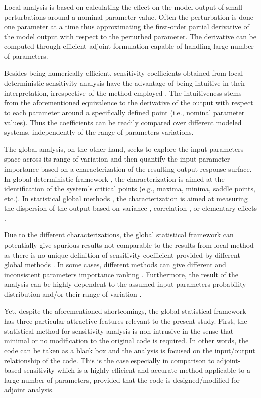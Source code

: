 Local analysis is based on calculating the effect on the model output of small perturbations around a nominal parameter value. 
Often the perturbation is done one parameter at a time thus approximating the first-order partial derivative of the model output with respect to the perturbed parameter. 
The derivative can be computed through efficient adjoint formulation \cite{Cacuci2003,Cacuci2010} capable of handling large number of parameters.

Besides being numerically efficient, 
sensitivity coefficients obtained from local deterministic sensitivity analysis have the advantage of being intuitive in their interpretation, 
irrespective of the method employed \cite{Razavi2015}. 
The intuitiveness stems from the aforementioned equivalence to the derivative of the output with respect to each parameter \cite{Ionescu-Bujor2004} around a specifically defined point (i.e., nominal parameter values). 
Thus the coefficients can be readily compared over different modeled systems, 
independently of the range of parameters variations.

The global analysis, on the other hand, 
seeks to explore the input parameters space across its range of variation 
and then quantify the input parameter importance based on a characterization of the resulting output response surface. 
In global deterministic framework \cite{Ionescu-Bujor2004,Cacuci2010}, 
the characterization is aimed at the identification of the system’s critical points (e.g., maxima, minima, saddle points, etc.). 
In statistical global methods \cite{Saltelli2008, Saltelli2004, Saltelli2006}, 
the characterization is aimed at measuring the dispersion of the output based on variance \cite{Sobol2001,Cukier1978}, 
correlation \cite{Helton1993}, or elementary effects \cite{Morris1991}.

Due to the different characterizations, 
the global statistical framework can potentially give spurious results not comparable to the results from local method 
as there is no unique definition of sensitivity coefficient provided by different global methods \cite{Razavi2015}. 
In some cases, different methods can give different and inconsistent parameters importance ranking \cite{Saltelli2008,Saltelli2004}. 
Furthermore, the result of the analysis can be highly dependent to the assumed input parameters probability distribution and/or their range of variation \cite{Cacuci2004,Cacuci2010}.

Yet, despite the aforementioned shortcomings, 
the global statistical framework has three particular attractive features relevant to the present study. 
First, the statistical method for sensitivity analysis is non-intrusive in the sense that minimal or no modification to the original code is required. 
In other words, the code can be taken as a black box and the analysis is focused on the input/output relationship \cite{Saltelli2008} of the code. 
This is the case especially in comparison to adjoint-based sensitivity \cite{Cacuci2000,Ionescu-Bujor2000} which is a highly efficient and accurate method applicable to a large number of parameters, 
provided that the code is designed/modified for adjoint analysis.


